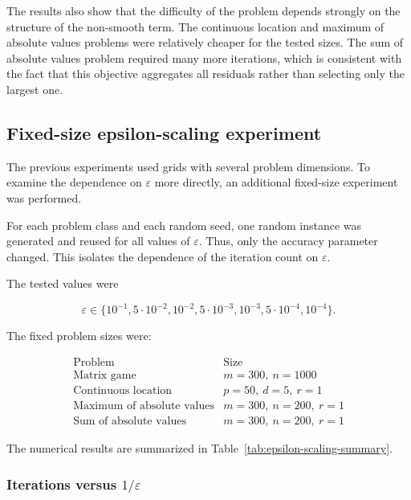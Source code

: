 \documentclass[11pt]{article}
\begin{document}
The results also show that the difficulty of the problem depends strongly on
the structure of the non-smooth term. The continuous location and maximum of
absolute values problems were relatively cheaper for the tested sizes. The sum
of absolute values problem required many more iterations, which is consistent
with the fact that this objective aggregates all residuals rather than selecting
only the largest one.



\subsection{Fixed-size epsilon-scaling experiment}

The previous experiments used grids with several problem dimensions. To examine
the dependence on \(\varepsilon\) more directly, an additional fixed-size
experiment was performed.

For each problem class and each random seed, one random instance was generated
and reused for all values of \(\varepsilon\). Thus, only the accuracy parameter
changed. This isolates the dependence of the iteration count on
\(\varepsilon\).

The tested values were

\[
    \varepsilon
    \in
    \{10^{-1},5\cdot10^{-2},10^{-2},5\cdot10^{-3},
    10^{-3},5\cdot10^{-4},10^{-4}\}.
\]

The fixed problem sizes were:

\[
\begin{array}{l|c}
\text{Problem} & \text{Size}\\
\hline
\text{Matrix game} & m=300,\ n=1000\\
\text{Continuous location} & p=50,\ d=5,\ r=1\\
\text{Maximum of absolute values} & m=300,\ n=200,\ r=1\\
\text{Sum of absolute values} & m=300,\ n=200,\ r=1
\end{array}
\]

The numerical results are summarized in Table~\ref{tab:epsilon-scaling-summary}.

\begin{table}[H]
    \centering
    
    \caption{Summary of the fixed-size epsilon-scaling experiment.}
    \label{tab:epsilon-scaling-summary}
\end{table}

\subsubsection{Iterations versus \texorpdfstring{\(1/\varepsilon\)}{1/epsilon}}
\end{document}
